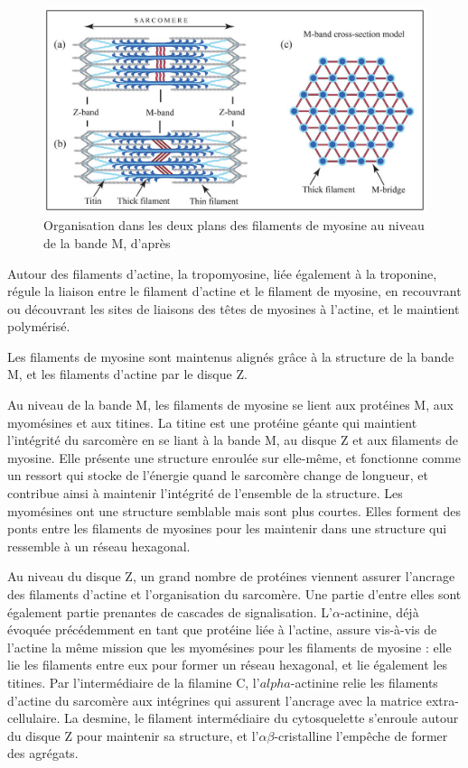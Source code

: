 \begin{figure}
\includegraphics[scale=0.4]{Figures/Myomesine.png}
\caption{Organisation dans les deux plans des filaments de myosine au niveau de la bande M, d'après \cite{tskhovrebova_2012}}
\end{figure}
 
Autour des filaments d'actine, la tropomyosine, liée également à la troponine, régule la liaison entre le filament d'actine et le filament de myosine, en recouvrant ou découvrant les sites de liaisons des têtes de myosines à l'actine, et le maintient polymérisé. 

Les filaments de myosine sont maintenus alignés grâce à la structure de la bande M, et les filaments d'actine par le disque Z. 

Au niveau de la bande M, les filaments de myosine se lient aux protéines M, aux myomésines et aux titines. 
La titine est une protéine géante qui maintient l'intégrité du sarcomère en se liant à la bande M, au disque Z et aux filaments de myosine. Elle présente une structure enroulée sur elle-même, et fonctionne comme un ressort qui stocke de l'énergie quand le sarcomère change de longueur, et contribue ainsi à maintenir l'intégrité de l'ensemble de la structure. 
Les myomésines ont une structure semblable mais sont plus courtes. Elles forment des ponts entre les filaments de myosines pour les maintenir dans une structure qui ressemble à un réseau hexagonal. 

Au niveau du disque Z, un grand nombre de protéines viennent assurer l'ancrage des filaments d'actine et l'organisation du sarcomère. Une partie d'entre elles sont également partie prenantes de cascades de signalisation.
L'$\alpha$-actinine, déjà évoquée précédemment en tant que protéine liée à l'actine, assure vis-à-vis de l'actine la même mission que les myomésines pour les filaments de myosine : elle lie les filaments entre eux pour former un réseau hexagonal, et lie également les titines. 
Par l'intermédiaire de la filamine C, l'$alpha$-actinine relie les filaments d'actine du sarcomère aux intégrines qui assurent l'ancrage avec la matrice extra-cellulaire. 
La desmine, le filament intermédiaire du cytosquelette s'enroule autour du disque Z pour maintenir sa structure, et l'$\alpha\beta$-cristalline l'empêche de former des agrégats. 


